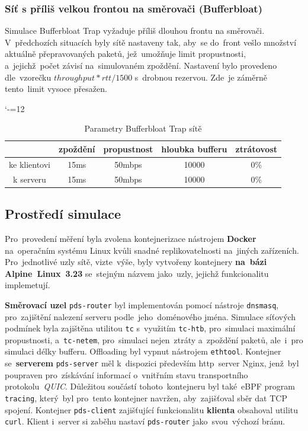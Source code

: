 \documentclass[a4paper,11pt]{article}
\begin{document}
\subsubsection{Síť s příliš velkou frontou na směrovači (Bufferbloat)}
Simulace Bufferbloat Trap vyžaduje příliš dlouhou frontu na směrovači. V~předchozích situacích byly sítě nastaveny tak, aby~se do~front vešlo
množství aktuálně přepravovaných paketů, jež~umožňuje limit propustnosti, a~jejichž~počet závisí na~simulovaném zpoždění.
Nastavení bylo provedeno dle~vzorečku $ throughput * rtt / 1500 $ s~drobnou rezervou. Zde~je záměrně tento~limit vysoce přesažen.
\begin{table}[h]
\begin{center}
\catcode`-=12
\begin{tabular}{|c|cccc|} \hline
	& \textbf{zpoždění} & \textbf{propustnost} & \textbf{hloubka bufferu} & \textbf{ztrátovost} \\ \hline
	ke klientovi & 15ms & 50mbps & 10000 & 0\% \\
	k serveru    & 15ms & 50mbps & 10000 & 0\% \\ \hline
\end{tabular}
\caption{Parametry Bufferbloat Trap sítě}
\end{center}
\end{table}

\subsection{Prostředí simulace} \label{subsec-containers}
Pro~provedení měření byla zvolena kontejnerizace nástrojem \textbf{Docker} na~operačním systému Linux kvůli snadné replikovatelnosti na~jiných zařízeních.
Pro~jednotlivé uzly sítě, vizte~výše, byly vytvořeny kontejnery \textbf{na~bázi Alpine~Linux~3.23} se~stejným názvem jako~uzly, jejichž funkcionalitu implemetují.

\textbf{Směrovací uzel} \verb|pds-router| byl implementován pomocí nástroje \verb|dnsmasq|, pro~zajištění nalezení serveru podle~jeho~doménového jména.
Simulace síťových podmínek byla zajištěna utilitou \verb|tc| s~využitím \verb|tc-htb|, pro~simulaci maximální propustnosti, a~\verb|tc-netem|, pro~simulaci nejen~ztráty a~zpoždění paketů,
ale~i~pro simulaci délky bufferu. Offloading byl vypnut nástrojem \verb|ethtool|.
Kontejner se~\textbf{serverem} \verb|pds-server| měl k~dispozici především http~server Nginx, jenž~byl poupraven pro~získávání informací o~vnitřním stavu transportního protokolu~\textit{QUIC}.
Důležitou součástí tohoto~kontejneru byl také~eBPF program \verb|tracing|, který~byl pro~tento kontejner navržen, aby~zajišťoval sběr dat TCP spojení.
Kontejner \verb|pds-client| zajišťující funkcionalitu \textbf{klienta} obsahoval utilitu \verb|curl|. Klient i~server si zaběhu nastaví \verb|pds-router| jako~svou~výchozí bránu.
\end{document}
